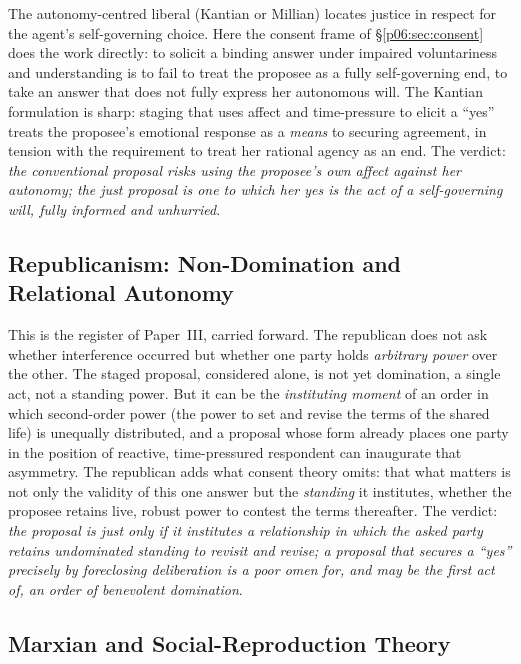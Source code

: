 The autonomy-centred liberal (Kantian or Millian) locates justice in respect for the agent's self-governing choice. Here the consent frame of §\ref{p06:sec:consent} does the work directly: to solicit a binding answer under impaired voluntariness and understanding is to fail to treat the proposee as a fully self-governing end, to take an answer that does not fully express her autonomous will. The Kantian formulation is sharp: staging that uses affect and time-pressure to elicit a ``yes'' treats the proposee's emotional response as a \emph{means} to securing agreement, in tension with the requirement to treat her rational agency as an end. The verdict: \emph{the conventional proposal risks using the proposee's own affect against her autonomy; the just proposal is one to which her yes is the act of a self-governing will, fully informed and unhurried}.

\subsection{Republicanism: Non-Domination and Relational Autonomy}

This is the register of Paper~III, carried forward. The republican does not ask whether interference occurred but whether one party holds \emph{arbitrary power} over the other. The staged proposal, considered alone, is not yet domination, a single act, not a standing power. But it can be the \emph{instituting moment} of an order in which second-order power (the power to set and revise the terms of the shared life) is unequally distributed, and a proposal whose form already places one party in the position of reactive, time-pressured respondent can inaugurate that asymmetry. The republican adds what consent theory omits: that what matters is not only the validity of this one answer but the \emph{standing} it institutes, whether the proposee retains live, robust power to contest the terms thereafter. The verdict: \emph{the proposal is just only if it institutes a relationship in which the asked party retains undominated standing to revisit and revise; a proposal that secures a ``yes'' precisely by foreclosing deliberation is a poor omen for, and may be the first act of, an order of benevolent domination}.

\subsection{Marxian and Social-Reproduction Theory}

